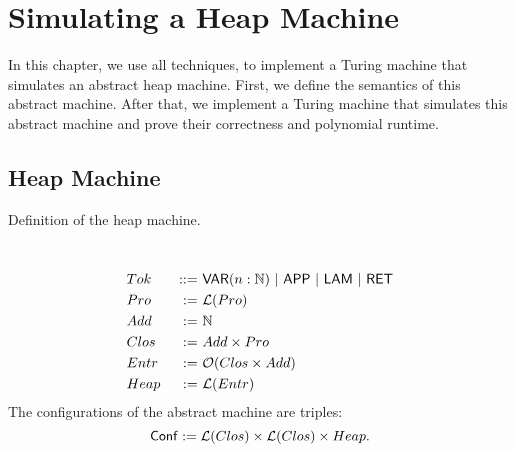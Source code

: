 \chapter{Simulating a Heap Machine}
\label{chap:heap}

In this chapter, we use all techniques, to implement a Turing machine that simulates an abstract heap machine.  First, we define the semantics of this
abstract machine.  After that, we implement a Turing machine that simulates this abstract machine and prove their correctness and polynomial runtime.

\section{Heap Machine}
\label{sec:heap-def}


Definition of the heap machine.

\begin{definition}
  ~
  \begin{alignat*}{2}
    &Tok  &~::=~& \mathsf{VAR}(n:\mathbb{N}) ~|~ \mathsf{APP} ~|~ \mathsf{LAM} ~|~ \mathsf{RET} \\
    &Pro  &~:=~& \mathcal{L}(Pro) \\
    &Add  &~:=~& \mathbb{N} \\
    &Clos &~:=~& Add \times Pro \\
    &Entr &~:=~& \mathcal{O}(Clos \times Add) \\
    &Heap &~:=~& \mathcal{L}(Entr)
  \end{alignat*}
  The configurations of the abstract machine are triples:
  \[
    \mathsf{Conf} := \mathcal{L}(Clos) \times \mathcal{L}(Clos) \times Heap.
  \]
\end{definition}


